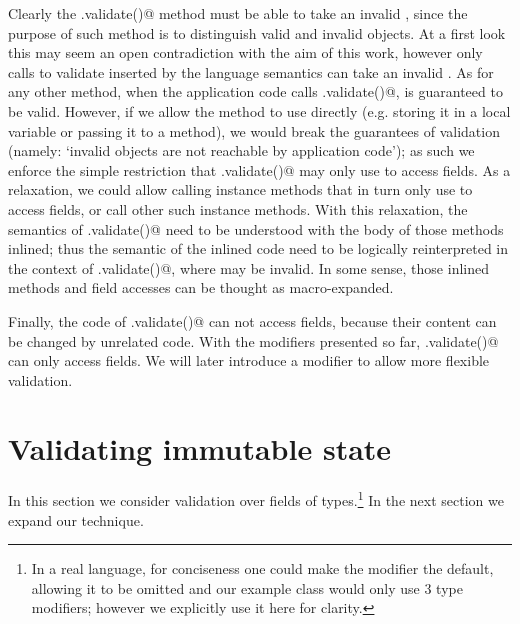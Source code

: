 Clearly the \Q@.validate()@ method must be able to take an invalid \Q@this@, since the purpose of such method is to distinguish valid and invalid objects.
At a first look this may seem an open contradiction
with the aim of this work, however only calls to validate inserted by the language semantics can take an invalid \Q@this@. As for any other method, when the application code calls \Q@.validate()@,
\Q@this@ is guaranteed to be valid.
However, if we allow the method to use \Q@this@ directly (e.g. storing it in a local variable or passing it to a method), we would break the guarantees of validation (namely: `invalid objects are not reachable by application code'); as such we enforce the simple restriction that \Q@.validate()@ may only use \Q@this@ to access fields.
As a relaxation, we could allow calling instance methods that in turn only use \Q@this@ to access fields, or call other such instance methods. With this relaxation, the semantics of \Q@.validate()@ need to be understood with the body of those methods inlined; thus the semantic of the inlined code need to be logically reinterpreted in the context of \Q@.validate()@, where \Q@this@ may be invalid.
In some sense, those inlined methods and field accesses can be thought as macro-expanded.


Finally,
the code of \Q@.validate()@ can not access  \Q@mut@ fields, because their content can be changed by unrelated code.
With the modifiers presented so far, \Q@.validate()@ can only access \Q@imm@ fields.
We will later introduce a \Q@capsule@ modifier to allow more flexible validation.



%

\section{Validating immutable state}
\label{s:immState}
In this section we consider validation over fields of \Q@imm@ types.\footnote{
In a real language, for conciseness one could make the \Q@imm@ modifier the default, allowing it to be omitted and our \Q@Person@ example class would only use 3 type modifiers; however we explicitly use it here for clarity.
}
In the next section we expand our technique.

